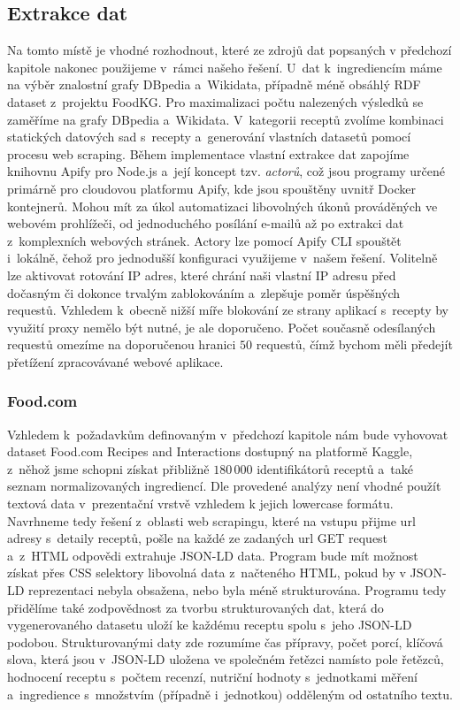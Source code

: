 \subsection{Extrakce dat}

Na tomto místě je vhodné rozhodnout, které ze zdrojů dat popsaných v předchozí kapitole nakonec použijeme v~rámci našeho řešení. U~dat k~ingrediencím máme na výběr znalostní grafy DBpedia a~Wikidata, případně méně obsáhlý RDF dataset z~projektu FoodKG. Pro maximalizaci počtu nalezených výsledků se zaměříme na grafy DBpedia a~Wikidata. V~kategorii receptů zvolíme kombinaci statických datových sad s~recepty a~generování vlastních datasetů pomocí procesu web scraping. Během implementace vlastní extrakce dat zapojíme knihovnu Apify pro Node.js a~její koncept tzv. \emph{actorů}, což jsou programy určené primárně pro cloudovou platformu Apify, kde jsou spouštěny uvnitř Docker kontejnerů. Mohou mít za úkol automatizaci libovolných úkonů prováděných ve webovém prohlížeči, od jednoduchého posílání e-mailů až po extrakci dat z~komplexních webových stránek. Actory lze pomocí Apify CLI spouštět i~lokálně, čehož pro jednodušší konfiguraci využijeme v~našem řešení. Volitelně lze aktivovat rotování IP adres, které chrání naši vlastní IP adresu před dočasným či dokonce trvalým zablokováním a~zlepšuje poměr úspěšných requestů. Vzhledem k~obecně nižší míře blokování ze strany aplikací s~recepty by využití proxy nemělo být nutné, je ale doporučeno. Počet současně odesílaných requestů omezíme na doporučenou hranici $50$ requestů, čímž bychom měli předejít přetížení zpracovávané webové aplikace.

\subsubsection{Food.com}

Vzhledem k~požadavkům definovaným v~předchozí kapitole nám bude vyhovovat dataset Food.com Recipes and Interactions dostupný na platformě Kaggle, z~něhož jsme schopni získat přibližně $180\,000$ identifikátorů receptů a~také seznam normalizovaných ingrediencí. Dle provedené analýzy není vhodné použít textová data v~prezentační vrstvě vzhledem k jejich lowercase formátu. Navrhneme tedy řešení z~oblasti web scrapingu, které na vstupu přijme url adresy s~detaily receptů, pošle na každé ze zadaných url GET request a~z~HTML odpovědi extrahuje JSON-LD data. Program bude mít možnost získat přes CSS selektory libovolná data z~načteného HTML, pokud by v JSON-LD reprezentaci nebyla obsažena, nebo byla méně strukturována. Programu tedy přidělíme také zodpovědnost za tvorbu strukturovaných dat, která do vygenerovaného datasetu uloží ke každému receptu spolu s~jeho JSON-LD podobou. Strukturovanými daty zde rozumíme čas přípravy, počet porcí, klíčová slova, která jsou v~JSON-LD uložena ve společném řetězci namísto pole řetězců, hodnocení receptu s~počtem recenzí, nutriční hodnoty s~jednotkami měření a~ingredience s~množstvím (případně i~jednotkou) odděleným od ostatního textu.

